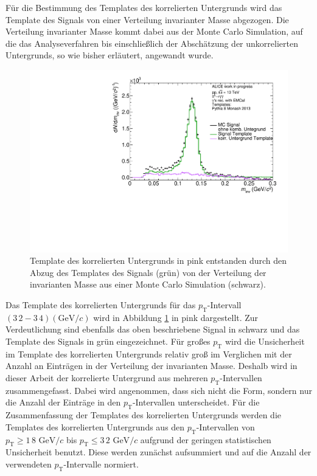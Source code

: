 F\"ur die Bestimmung des Templates des korrelierten Untergrunds wird das Template des Signals von einer Verteilung invarianter Masse abgezogen.
Die Verteilung invarianter Masse kommt dabei aus der Monte Carlo Simulation, auf die das Analyseverfahren bis einschlie{\ss}lich der Absch\"atzung der unkorrelierten Untergrunds, so wie bisher erl\"autert, angewandt wurde.
\begin{figure}[tp]
\centering
\includegraphics[width=.75\linewidth]{EntstehungUntergrund10_Data_2016.pdf}
\caption{Template des korrelierten Untergrunds in pink entstanden durch den Abzug des Templates des Signals (gr\"un) von der Verteilung der invarianten Masse aus einer Monte Carlo Simulation (schwarz).}
\label{fig:BkgTemp}
\end{figure}
\newline
Das Template des korrelierten Untergrunds f\"ur das $p_\text{T}$-Intervall $(3\,2 - 3\,4) (\text{GeV/}c)$ wird in Abbildung \ref{fig:BkgTemp} in pink dargestellt.
Zur Verdeutlichung sind ebenfalls das oben beschriebene Signal in schwarz und das Template des Signals in gr\"un eingezeichnet.
\newline
F\"ur gro{\ss}es $p_\text{T}$ wird die Unsicherheit im Template des korrelierten Untergrunds relativ gro{\ss} im Verglichen mit der Anzahl an Eintr\"agen in der Verteilung der invarianten Masse.
Deshalb wird in dieser Arbeit der korrelierte Untergrund aus mehreren $p_\text{T}$-Intervallen zusammengefasst.
Dabei wird angenommen, dass sich nicht die Form, sondern nur die Anzahl der Eintr\"age in den $p_\text{T}$-Intervallen unterscheidet.  
F\"ur die Zusammenfassung der Templates des korrelierten Untergrunds werden die Templates des korrelierten Untergrunds aus den $p_\text{T}$-Intervallen von $p_\text{T} \geq 1\,8\text{ GeV}/c$ bis $p_\text{T} \leq 3\,2\text{ GeV}/c$ aufgrund der geringen statistischen Unsicherheit benutzt.
Diese werden zun\"achst aufsummiert und auf die Anzahl der verwendeten $p_\text{T}$-Intervalle normiert.
